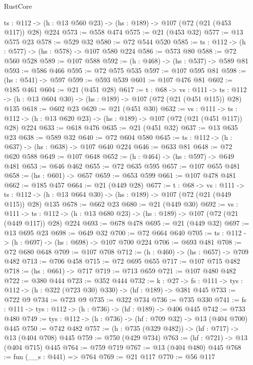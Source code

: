 \begin{lexlean}{RustCore}
\begin{coremodule}
  {ts : @112} -> (h : @13 @560 @23) -> (hs : @189) -> @107 (@72 (@21 (@453 @117)) @28) @224
@573 := @558 @474
@575 := @21 (@453 @32)
@577 := @13 @575 @23
@578 := @529 @32
@580 := @72 @544 @520
@585 := {ts : @112} -> (h : @577) -> (hs : @578) -> @107 @580 @224
@586 := @573 @80
@588 := @72 @560 @528
@589 := @107 @588
@592 := (h : @468) -> (hs : @537) -> @589 @81
@593 := @586 @466
@595 := @72 @575 @535
@597 := @107 @595 @81
@598 := (hs : @541) -> @597
@599 := @593 @539
@601 := @107 @476 @81
@602 := @185 @461
@604 := @21 (@451 @28)
@617 := {t : @68} ->
  {vs : @111} ->
  {ts : @112} -> (h : @13 @604 @30) -> (hs : @189) -> @107 (@72 (@21 (@451 @115)) @28) @135
@618 := @602 @23
@620 := @21 (@451 @30)
@632 := {vs : @111} ->
  {ts : @112} -> (h : @13 @620 @23) -> (hs : @189) -> @107 (@72 (@21 (@451 @117)) @28) @224
@633 := @618 @476
@635 := @21 (@451 @32)
@637 := @13 @635 @23
@638 := @589 @32
@640 := @72 @604 @580
@645 := {ts : @112} -> (h : @637) -> (hs : @638) -> @107 @640 @224
@646 := @633 @81
@648 := @72 @620 @588
@649 := @107 @648
@652 := (h : @464) -> (hs : @597) -> @649 @481
@653 := @646 @462
@655 := @72 @635 @595
@657 := @107 @655 @481
@658 := (hs : @601) -> @657
@659 := @653 @599
@661 := @107 @478 @481
@662 := @185 @457
@664 := @21 (@449 @28)
@677 := {t : @68} ->
  {vs : @111} ->
  {ts : @112} -> (h : @13 @664 @30) -> (hs : @189) -> @107 (@72 (@21 (@449 @115)) @28) @135
@678 := @662 @23
@680 := @21 (@449 @30)
@692 := {vs : @111} ->
  {ts : @112} -> (h : @13 @680 @23) -> (hs : @189) -> @107 (@72 (@21 (@449 @117)) @28) @224
@693 := @678 @478
@695 := @21 (@449 @32)
@697 := @13 @695 @23
@698 := @649 @32
@700 := @72 @664 @640
@705 := {ts : @112} -> (h : @697) -> (hs : @698) -> @107 @700 @224
@706 := @693 @481
@708 := @72 @680 @648
@709 := @107 @708
@712 := (h : @460) -> (hs : @657) -> @709 @482
@713 := @706 @458
@715 := @72 @695 @655
@717 := @107 @715 @482
@718 := (hs : @661) -> @717
@719 := @713 @659
@721 := @107 @480 @482
@722 := @380 @444
@723 := @352 @444
@732 := {k : @27} ->
  {fs : @111} -> {tys : @112} -> (h : @322 (@723 @30) @330) -> (hf : @189) -> @381 @445
@733 := @722 @9
@734 := @723 @9
@735 := @322 @734
@736 := @735 @330
@741 := {fs : @111} -> {tys : @112} -> (h : @736) -> (hf : @189) -> @406 @445
@742 := @733 @480
@749 := {tys : @112} -> (h : @736) -> (hf : @709 @32) -> @13 (@404 @700) @445
@750 := @742 @482
@757 := (h : @735 (@329 @482)) -> (hf : @717) -> @13 (@404 @708) @445
@759 := @750 (@429 @734)
@763 := (hf : @721) -> @13 (@404 @715) @445
@764 := @759 @719
@767 := @13 (@404 @480) @445
@768 := fun (__s : @441) => @764
@769 := @21 @117
@770 := @56 @117

\end{coremodule}
\end{lexlean}
